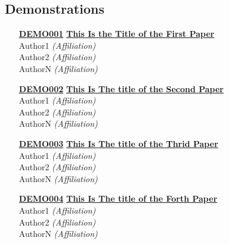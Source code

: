 \subsection{Demonstrations}
\begin{enumerate}
\item[\href{https://doi.org/10.1145/1122445.1122456}{\textbf{DEMO001}}]
\href{https://doi.org/10.1145/1122445.1122456}{\textbf{This Is the Title of the First Paper}}\\
Author1 \emph{(Affiliation)}\\
Author2 \emph{(Affiliation)}\\
AuthorN \emph{(Affiliation)}\\

\item[\href{https://doi.org/10.1145/1122445.1122456}{\textbf{DEMO002}}]
\href{https://doi.org/10.1145/1122445.1122456}{\textbf{This Is The title of the Second Paper}}\\
Author1 \emph{(Affiliation)}\\
Author2 \emph{(Affiliation)}\\
AuthorN \emph{(Affiliation)}\\

\item[\href{https://doi.org/10.1145/1122445.1122456}{\textbf{DEMO003}}]
\href{https://doi.org/10.1145/1122445.1122456}{\textbf{This Is The title of the Thrid Paper}}\\
Author1 \emph{(Affiliation)}\\
Author2 \emph{(Affiliation)}\\
AuthorN \emph{(Affiliation)}\\

\item[\href{https://doi.org/10.1145/1122445.1122456}{\textbf{DEMO004}}]
\href{https://doi.org/10.1145/1122445.1122456}{\textbf{This Is The title of the Forth Paper}}\\
Author1 \emph{(Affiliation)}\\
Author2 \emph{(Affiliation)}\\
AuthorN \emph{(Affiliation)}\\
\end{enumerate}



